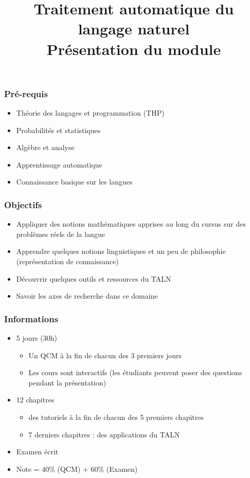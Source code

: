 \documentclass{beamer}
\title[TALN : Présentation] %
{Traitement automatique du langage naturel\\Présentation du module}
\begin{document}
\begin{frame}
\frametitle{Pré-requis}

\begin{itemize}
	\item Théorie des langages et programmation (THP)
	\item Probabilités et statistiques
	\item Algèbre et analyse 
	\item Apprentissage automatique 
	\item Connaissance basique sur les langues
\end{itemize}

\end{frame}


\begin{frame}
\frametitle{Objectifs}

\begin{itemize}
	\item Appliquer des notions mathématiques apprises au long du cursus sur des problèmes réels de la langue 
	\item Apprendre quelques notions linguistiques et un peu de philosophie (représentation de connaissance) 
	\item Découvrir quelques outils et ressources du TALN
	\item Savoir les axes de recherche dans ce domaine
\end{itemize}

\end{frame}


\begin{frame}
\frametitle{Informations}

\begin{itemize}
	\item 5 jours (30h)
	\begin{itemize}
		\item Un QCM à la fin de chacun des 3 premiers jours
		\item Les cours sont interactifs (les étudiants peuvent poser des questions pendant la présentation)
	\end{itemize}
	\item 12 chapitres
	\begin{itemize}
		\item des tutoriels à la fin de chacun des 5 premiers chapitres
		\item 7 derniers chapitres : des applications du TALN
	\end{itemize}
	\item Examen écrit 
	\item Note = 40\% (QCM) + 60\% (Examen)
\end{itemize}

\end{frame}
\end{document}
